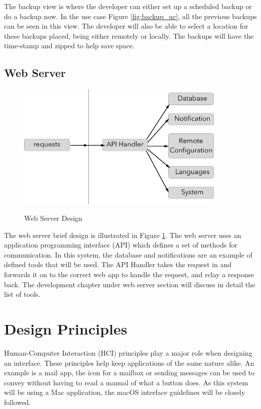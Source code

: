 The backup view is where the developer can either set up a scheduled backup or do a backup now. In the use case Figure \ref{fig:backup_uc}, all the previous backups can be seen in this view. The developer will also be able to select a location for these backups placed, being either remotely or locally. The backups will have the time-stamp and zipped to help save space.

\subsection{Web Server} \label{d-web_server}

\begin{figure}[!h]
    \caption{Web Server Design}
    \centering
    \includegraphics[width=100mm]{images/design/api_handler}
    \label{fig:api_handler}
\end{figure}

The web server brief design is illustrated in Figure \ref{fig:api_handler}. The web server uses an application programming interface (API) which defines a set of methods for communication. In this system, the database and notifications are an example of defined tools that will be used. The API Handler takes the request in and forwards it on to the correct web app to handle the request, and relay a response back. The development chapter under web server section will discuss in detail the list of tools.


\section{Design Principles}

Human-Computer Interaction (HCI) principles play a major role when designing an interface. These principles help keep applications of the same nature alike. An example is a mail app, the icon for a mailbox or sending messages can be used to convey without having to read a manual of what a button does. As this system will be using a Mac application, the macOS interface guidelines will be closely followed.

